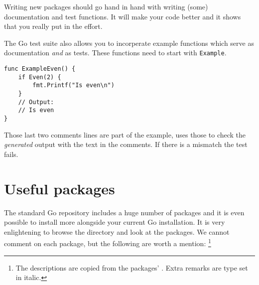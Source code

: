 \begin{lbar}
Writing new packages should go hand in hand with writing (some)
documentation and test functions. It will make your code better and it
shows that you really put in the effort.
\end{lbar}

The Go test suite also allows you to incorperate example functions which
serve as documentation \emph{and} as tests. These functions need to
start with \texttt{Example}.
\begin{lstlisting}
func ExampleEven() {
    if Even(2) {
        fmt.Printf("Is even\n")
    }
    // Output:
    // Is even
}
\end{lstlisting}
Those last two comments lines are part of the example,  uses those
to check the \emph{generated} output with the text in the comments. If there is
a mismatch the test fails.

\section{Useful packages}
The standard Go repository includes a huge number of packages and it is
even possible to install more alongside your current Go installation.
It is very enlightening to browse the  directory and
look at the packages.
We cannot comment on each package, but the following are worth a mention:
\footnote{The descriptions are copied from the packages' . Extra
remarks are type set in italic.}

